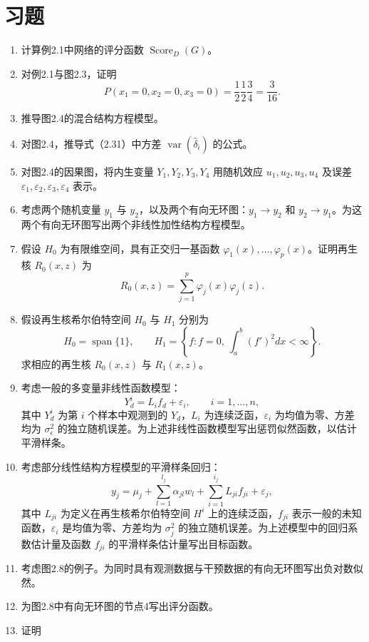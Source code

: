 \section*{习题}
\begin{enumerate}[label=\textbf{习题 \arabic*.},leftmargin=4.6em,labelsep=.7em]
\item 计算例2.1中网络的评分函数 $\operatorname{Score}_D(G)$。
\item 对例2.1与图2.3，证明
\[
P(x_1=0,x_2=0,x_3=0)=\frac12\frac12\frac34=\frac3{16}.
\]
\item 推导图2.4的混合结构方程模型。
\item 对图2.4，推导式（2.31）中方差 $\operatorname{var}(\widehat\delta_i)$ 的公式。
\item 对图2.4的因果图，将内生变量 $Y_1,Y_2,Y_3,Y_4$ 用随机效应 $u_1,u_2,u_3,u_4$ 及误差 $\varepsilon_1,\varepsilon_2,\varepsilon_3,\varepsilon_4$ 表示。
\item 考虑两个随机变量 $y_1$ 与 $y_2$，以及两个有向无环图：$y_1\to y_2$ 和 $y_2\to y_1$。为这两个有向无环图写出两个非线性加性结构方程模型。
\item 假设 $H_0$ 为有限维空间，具有正交归一基函数 $\varphi_1(x),\ldots,\varphi_p(x)$。证明再生核 $R_0(x,z)$ 为
\[
R_0(x,z)=\sum_{j=1}^p\varphi_j(x)\varphi_j(z).
\]
\item 假设再生核希尔伯特空间 $H_0$ 与 $H_1$ 分别为
\[
H_0=\operatorname{span}\{1\},
\qquad
H_1=\left\{f:f=0,\ \int_a^b(f')^2dx<\infty\right\}.
\]
求相应的再生核 $R_0(x,z)$ 与 $R_1(x,z)$。
\item 考虑一般的多变量非线性函数模型：
\[
Y_d^i=L_if_d+\varepsilon_i,\qquad i=1,\ldots,n,
\]
其中 $Y_d^i$ 为第 $i$ 个样本中观测到的 $Y_d$，$L_i$ 为连续泛函，$\varepsilon_i$ 为均值为零、方差均为 $\sigma_\epsilon^2$ 的独立随机误差。为上述非线性函数模型写出惩罚似然函数，以估计平滑样条。
\item 考虑部分线性结构方程模型的平滑样条回归：
\[
y_j=\mu_j+\sum_{l=1}^{l_j}\alpha_{jl}w_l
 +\sum_{i=1}^{i_j}L_{ji}f_{ji}+\varepsilon_j,
\]
其中 $L_{ji}$ 为定义在再生核希尔伯特空间 $H^i$ 上的连续泛函，$f_{ji}$ 表示一般的未知函数，$\varepsilon_i$ 是均值为零、方差均为 $\sigma_j^2$ 的独立随机误差。为上述模型中的回归系数估计量及函数 $f_{ji}$ 的平滑样条估计量写出目标函数。
\item 考虑图2.8的例子。为同时具有观测数据与干预数据的有向无环图写出负对数似然。
\item 为图2.8中有向无环图的节点4写出评分函数。
\item 证明

\end{enumerate}
